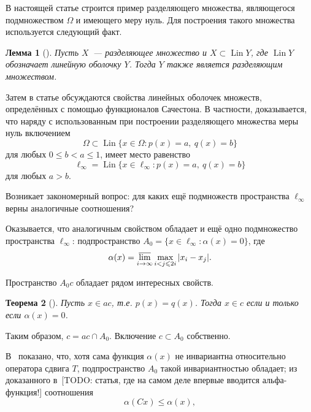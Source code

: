 \documentclass[a4paper,14pt]{article} %
\theoremstyle{plain}
\newtheorem{lemma}{Лемма}[section]
\newtheorem{theorem}[lemma]{Теорема}
\begin{document}
В настоящей статье строится пример разделяющего множества,
являющегося подмножеством $\Omega$ и имеющего меру нуль.
Для построения такого множества используется следующий факт.

\begin{lemma}[{\cite[\S 3, замечание 6]{Semenov2014geomprops}}]
	Пусть $X$~--- разделяющее множество и $X \subset \operatorname{Lin} Y$,
	где $\operatorname{Lin} Y$ обозначает линейную оболочку $Y$.
	Тогда $Y$ также является разделяющим множеством.
\end{lemma}

Затем в статье обсуждаются свойства линейных оболочек множеств, определённых с помощью функционалов Сачестона.
В частности, доказывается,
что наряду с использованным при построении разделяющего множества меры нуль включением
\begin{equation}
	\Omega \subset \operatorname{Lin}\{x\in\Omega : p(x) = a,~ q(x) = b\}
\end{equation}
для любых $0\leq b < a \leq 1$,
имеет место равенство
\begin{equation}
	\ell_\infty = \operatorname{Lin}\{x\in\ell_\infty : p(x) = a,~ q(x) = b\}
\end{equation}
для любых $a>b$.

Возникает закономерный вопрос: для каких ещё подмножеств пространства $\ell_\infty$
верны аналогичные соотношения?

Оказывается, что аналогичным свойством обладает и ещё одно подмножество пространства $\ell_\infty$: подпространство
$A_0 = \{ x \in \ell_\infty : \alpha(x) =0 \}$,
где~\cite{our-vzms-2018}
\begin{equation*}
	\alpha(x) = \varlimsup_{i\to\infty} \max_{i<j\leqslant 2i} |x_i - x_j|
	.
\end{equation*}

Пространство $A_0c$ обладает рядом интересных свойств.


\begin{theorem}[{\cite[следствие 2]{our-mz2019ac0}}]
	\label{thm:alpha_c_ac_c}
	Пусть $x\in ac$, т.е. $p(x) = q(x)$.
	Тогда $x\in c$ если и только если $\alpha(x) = 0$.
\end{theorem}
Таким образом, $c = ac \cap A_0$.
Включение $c\subset A_0$ собственно.

В~\cite{our-ped-2018-alpha-Tx} показано, что, хотя сама функция $\alpha(x)$ не инвариантна относительно оператора сдвига $T$,
подпространство $A_0$ такой инвариантностью обладает;
из доказанного в~[TODO: статья, где на самом деле впервые вводится альфа-функция!] соотношения
\begin{equation}
	\alpha(Cx) \leq \alpha(x)
	,
\end{equation} 
\end{document}

